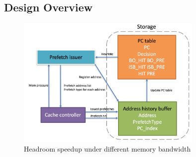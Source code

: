   \subsection{Design Overview}
  \label{sec:dynamicdesignoverview}
  \begin{figure}[ht!]
	   \centering
	   \includegraphics[width=0.8\textwidth]{images/dynamic_design.png}
	   \caption{Headroom speedup under different memory bandwidth}
	   \label{fig:dynamic_design}
  \end{figure}
